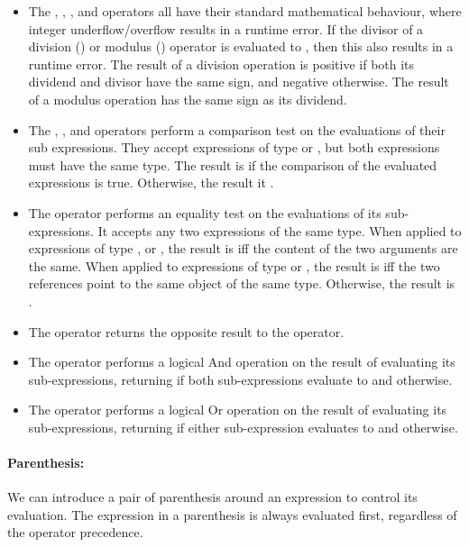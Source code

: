 \documentclass[a4paper]{article}
\theoremstyle{definition}
\begin{document}
\begin{itemize}
\item The \lit{*}, \lit{/}, \lit{\%}, \lit{+} and \lit{-} operators
all have their standard mathematical behaviour, where integer underflow/overflow results in a runtime error.
If the divisor of a division (\lit{/}) or modulus (\lit{\%}) operator is evaluated to , then this also results in a runtime error.
The result of a division operation is positive if both its dividend and divisor have the same sign, and negative otherwise.
The result of a modulus operation has the same sign as its dividend.

\item The \lit{>}, \lit{>=}, \lit{<} and \lit{<=} operators perform a comparison test on the evaluations of their sub expressions.
They accept expressions of type  or , but both expressions must have the same type.
The result is  if the comparison of the evaluated expressions is true.
Otherwise, the result it .

\item The \lit{==} operator performs an equality test on the evaluations of its sub-expressions.
It accepts any two expressions of the same type.
When applied to expressions of type ,  or , the result is  iff the content of the two arguments are the same.
When applied to expressions of type  or , the result is  iff the two references point to the same object of the same type.
Otherwise, the result is .

\item The \lit{!=} operator returns the opposite result to the \lit{==} operator.

\item The \lit{\&\&} operator performs a logical And operation on the result of evaluating its sub-expressions,
returning  if both sub-expressions evaluate to  and  otherwise.

\item The \lit{||} operator performs a logical Or operation on the result of evaluating its sub-expressions,
returning  if either sub-expression evaluates to  and  otherwise.
\end{itemize}

\paragraph{Parenthesis:}
We can introduce a pair of parenthesis around an expression to control its evaluation.
The expression in a parenthesis is always evaluated first, regardless of the operator precedence.
\end{document}
